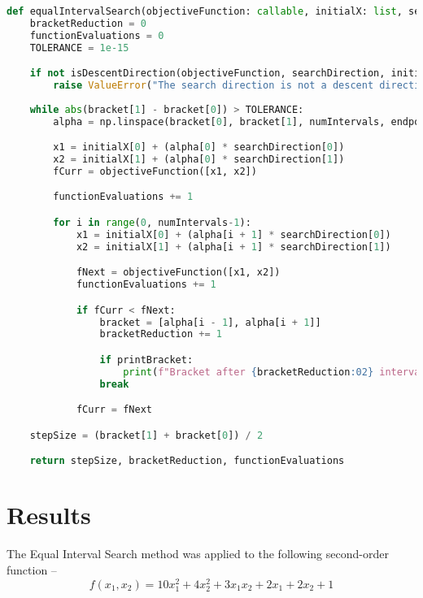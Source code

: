 \documentclass[11pt,a4paper]{article}
\begin{document}
\begin{lstlisting}[language=Python]
    def equalIntervalSearch(objectiveFunction: callable, initialX: list, searchDirection: list, bracket: list, numIntervals: int, printBracket: bool = True) -> tuple:
    bracketReduction = 0
    functionEvaluations = 0
    TOLERANCE = 1e-15

    if not isDescentDirection(objectiveFunction, searchDirection, initialX):
        raise ValueError("The search direction is not a descent direction")
    
    while abs(bracket[1] - bracket[0]) > TOLERANCE:
        alpha = np.linspace(bracket[0], bracket[1], numIntervals, endpoint=True)

        x1 = initialX[0] + (alpha[0] * searchDirection[0])
        x2 = initialX[1] + (alpha[0] * searchDirection[1])
        fCurr = objectiveFunction([x1, x2])

        functionEvaluations += 1

        for i in range(0, numIntervals-1):
            x1 = initialX[0] + (alpha[i + 1] * searchDirection[0])
            x2 = initialX[1] + (alpha[i + 1] * searchDirection[1])

            fNext = objectiveFunction([x1, x2])
            functionEvaluations += 1

            if fCurr < fNext:
                bracket = [alpha[i - 1], alpha[i + 1]]
                bracketReduction += 1

                if printBracket:
                    print(f"Bracket after {bracketReduction:02} interval reductions: [{bracket[0]:.16f}, {bracket[1]:.16f}]")
                break

            fCurr = fNext

    stepSize = (bracket[1] + bracket[0]) / 2

    return stepSize, bracketReduction, functionEvaluations
\end{lstlisting}

\section{Results}
The Equal Interval Search method was applied to the following second-order function – 
\begin{equation}
    f(x_1, x_2) = 10x_1^2 + 4x_2^2 + 3x_1x_2 + 2x_1 + 2x_2 + 1
\end{equation}
\end{document}
